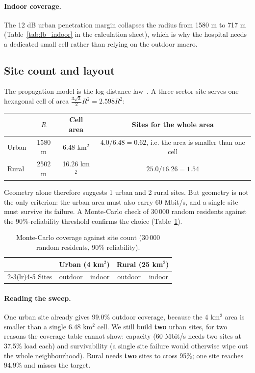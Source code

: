 \documentclass[9pt,a4paper]{article}
\newcommand{\key}[1]{\textbf{#1}}
\begin{document}
\paragraph{Indoor coverage.} The 12 dB urban penetration margin collapses the radius from
1580 m to 717 m (Table~\ref{tab:lb_indoor} in the calculation sheet), which is why the hospital
needs a dedicated small cell rather than relying on the outdoor macro.

\subsection{Site count and layout}
The propagation model is the log-distance law~\cite{rappaport}. A three-sector site serves one hexagonal cell of area $\frac{3\sqrt3}{2}R^2 = 2.598R^2$:

\begin{center}\small
\begin{tabular}{@{}lccc@{}}
\toprule
& $R$ & Cell area & Sites for the whole area \\
\midrule
Urban & 1580 m & 6.48 km$^2$ & $4.0/6.48 = 0.62$, i.e. the area is smaller than one cell \\
Rural & 2502 m & 16.26 km$^2$ & $25.0/16.26 = 1.54$ \\
\bottomrule
\end{tabular}
\end{center}

Geometry alone therefore suggests 1 urban and 2 rural sites. But geometry is not the only
criterion: the urban area must also carry 60 Mbit/s, and a single site must survive its failure.
A Monte-Carlo check of 30\,000 random residents against the 90\%-reliability threshold confirms
the choice (Table~\ref{tab:sweep}).

\begin{table}[H]\centering\small
\caption{Monte-Carlo coverage against site count (30\,000 random residents, 90\% reliability).}
\label{tab:sweep}
\begin{tabular}{@{}ccccc@{}}
\toprule
& \multicolumn{2}{c}{\textbf{Urban (4 km$^2$)}} & \multicolumn{2}{c}{\textbf{Rural (25 km$^2$)}} \\
\cmidrule(lr){2-3}\cmidrule(lr){4-5}
Sites & outdoor & indoor & outdoor & indoor \\
\midrule
\bottomrule
\end{tabular}
\end{table}

\paragraph{Reading the sweep.} One urban site already gives 99.0\% outdoor coverage, because the
4 km$^2$ area is smaller than a single 6.48 km$^2$ cell. We still build \key{two} urban sites, for
two reasons the coverage table cannot show: capacity (60 Mbit/s needs two sites at 37.5\% load
each) and survivability (a single site failure would otherwise wipe out the whole neighbourhood).
Rural needs \key{two} sites to cross 95\%; one site reaches 94.9\% and misses the target.
\end{document}
